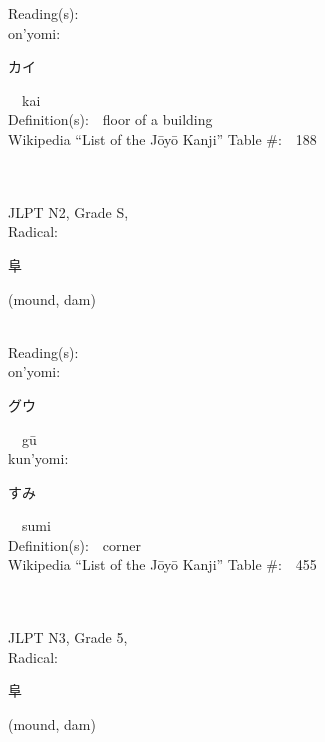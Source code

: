 \begin{multicols}{2}
Reading(s):\ \ \\
{\hspace*{1em}}on'yomi:\ \ \\
{\hspace*{2em}}{\begin{CJK}{UTF8}{min} カイ \end{CJK}}\ \ kai\ \ \\
Definition(s):\ \ floor of a building \\
Wikipedia ``List of the J\=oy\=o Kanji'' Table \#:\ \ 188 \\
\ \ \\
{\fontsize{34pt}{40pt}  }\ \ \\  %
{JLPT N2, Grade S, \\Radical:\ \ {\begin{CJK}{UTF8}{min} 阜 \end{CJK}} (mound, dam) } \\
Reading(s):\ \ \\
{\hspace*{1em}}on'yomi:\ \ \\
{\hspace*{2em}}{\begin{CJK}{UTF8}{min} グウ \end{CJK}}\ \ g\=u\ \ \\
{\hspace*{1em}}kun'yomi:\ \ \\
{\hspace*{2em}}{\begin{CJK}{UTF8}{min} すみ \end{CJK}}\ \ sumi\ \ \\
Definition(s):\ \ corner \\
Wikipedia ``List of the J\=oy\=o Kanji'' Table \#:\ \ 455 \\
\ \ \\
{\fontsize{34pt}{40pt}  }\ \ \\  %
{JLPT N3, Grade 5, \\Radical:\ \ {\begin{CJK}{UTF8}{min} 阜 \end{CJK}} (mound, dam) } \\

\end{multicols}
